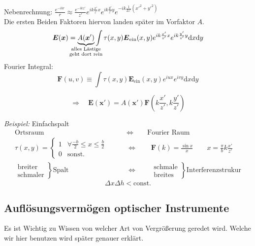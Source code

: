 \documentclass[titlepage,11pt,a4paper,ngerman]{report}
\newcommand{\tx}[1]{\textrm{#1}}
\newcommand{\const}{\tx{const.}}
\newcommand{\ub}[1]{\underbrace{#1}}
\newcommand{\dd}{\tx{d}}
\newcommand{\casess}[4]{\left\{ \begin{array}{ll} {#1} & {#2} \\ {#3} & {#4} \end{array} \right.}
\renewcommand{\vec}[1]{\boldsymbol{#1}}
\newcommand{\lcom}[1]{\color{MidnightBlue}#1\color{black}}
\newcommand{\frbox}[2]{\begin{tcolorbox}[colback=white,colframe=red!75!black,fonttitle=\bfseries,title=#1]#2\end{tcolorbox}}
\begin{document}
Nebenrechnung: $ \frac{e^{-ikr}}{r} \approx \frac{e^{-ikz'}}{z'} e^{ik\frac{x'}{z'}x} e^{ik\frac{y'}{z'}y} e^{-ik \frac{1}{2 z'} (x'^2 + y'^2)} $\\
Die ersten Beiden Faktoren hiervon landen später im Vorfaktor $ A $.
\begin{equation*}
\vec{E}(\vec{x}) = \ub{A(\vec{x}')}_{\mathclap{\substack{\tx{alles Lästige} \\ \tx{geht dort rein}}}} \int \tau(x,y) \vec{E}_{\tx{ein}}(x,y) e^{i k \frac{x'}{z'} x} e^{ik\frac{y'}{z'}y} \dd x \dd y
\end{equation*}
Fourier Integral:
\begin{equation*}
\vec{F} (u,v) \equiv \int \tau(x,y) \vec{E}_{\tx{ein}} (x,y) e^{iux} e^{ivy} \dd x \dd y
\end{equation*}
\frbox{Beugungsintegral für Frauenhofer Beugung}{
\begin{equation*}
\Rightarrow \quad \vec{E}(\vec{x}') = A(\vec{x}') \vec{F} \left(k \frac{x'}{z'} , k \frac{y'}{z'}\right)
\end{equation*}}
\noindent
\emph{Beispiel:} Einfachspalt
\begin{align*}
\tx{Ortsraum} \qquad &\Leftrightarrow \qquad \tx{Fourier Raum}\\
\tau(x,y) = \casess{1}{\forall  \frac{-b}{2} \le x \le \frac{b}{2}}{0}{\tx{sonst.}} \qquad &\Leftrightarrow \qquad \vec{F}(k) = \frac{\sin x}{x} \qquad x = \frac{\pi}{b} k \frac{x'}{z'}\\
\left.\begin{array}{c}
\tx{breiter} \\ \tx{schmaler}
\end{array}\right\} \tx{Spalt} \qquad &\Leftrightarrow \qquad \left.\begin{array}{c}
\tx{schmale} \\ \tx{breites}
\end{array}\right\} \tx{Interferenzstrukur}
\end{align*}
\begin{equation*}
\Delta x \Delta h < \const
\end{equation*}

\subsection{Auflösungsvermögen optischer Instrumente}

\lcom{Es ist Wichtig zu Wissen von welcher Art von Vergrößerung geredet wird. Welche wir hier benutzen wird später genauer erklärt.}
\end{document}
